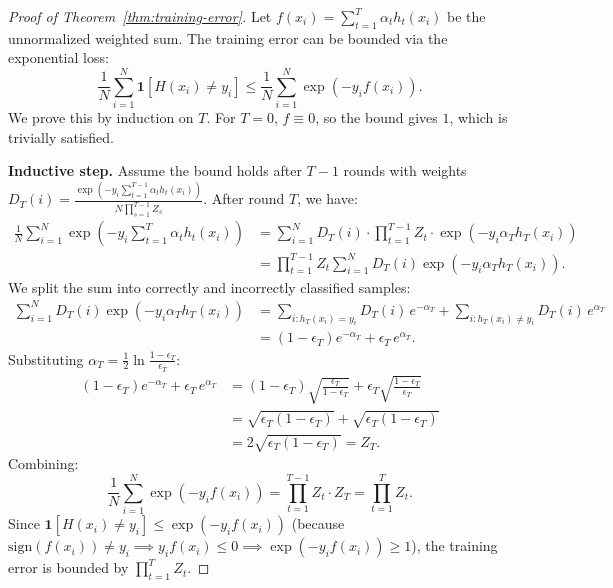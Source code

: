 \begin{proof}[Proof of Theorem~\ref{thm:training-error}]
Let $f(x_i) = \sum_{t=1}^{T} \alpha_t h_t(x_i)$ be the unnormalized weighted sum. The training error can be bounded via the exponential loss:
\[
\frac{1}{N}\sum_{i=1}^N \mathbf{1}[H(x_i) \neq y_i] \leq \frac{1}{N}\sum_{i=1}^N \exp(-y_i f(x_i)).
\]
We prove this by induction on $T$. For $T = 0$, $f \equiv 0$, so the bound gives $1$, which is trivially satisfied.

\textbf{Inductive step.} Assume the bound holds after $T - 1$ rounds with weights $D_T(i) = \frac{\exp(-y_i \sum_{t=1}^{T-1} \alpha_t h_t(x_i))}{N \prod_{s=1}^{T-1} Z_s}$. After round $T$, we have:
\begin{align*}
\frac{1}{N}\sum_{i=1}^N \exp\!\left(-y_i \sum_{t=1}^{T} \alpha_t h_t(x_i)\right)
&= \sum_{i=1}^N D_T(i) \cdot \prod_{t=1}^{T-1} Z_t \cdot \exp(-y_i \alpha_T h_T(x_i)) \\
&= \prod_{t=1}^{T-1} Z_t \sum_{i=1}^N D_T(i) \exp(-y_i \alpha_T h_T(x_i)).
\end{align*}
We split the sum into correctly and incorrectly classified samples:
\begin{align*}
\sum_{i=1}^N D_T(i) \exp(-y_i \alpha_T h_T(x_i))
&= \sum_{i: h_T(x_i) = y_i} D_T(i) \, e^{-\alpha_T} + \sum_{i: h_T(x_i) \neq y_i} D_T(i) \, e^{\alpha_T} \\
&= (1 - \epsilon_T) e^{-\alpha_T} + \epsilon_T \, e^{\alpha_T}.
\end{align*}
Substituting $\alpha_T = \frac{1}{2}\ln\frac{1-\epsilon_T}{\epsilon_T}$:
\begin{align*}
(1 - \epsilon_T) e^{-\alpha_T} + \epsilon_T \, e^{\alpha_T}
&= (1 - \epsilon_T) \sqrt{\frac{\epsilon_T}{1 - \epsilon_T}} + \epsilon_T \sqrt{\frac{1 - \epsilon_T}{\epsilon_T}} \\
&= \sqrt{\epsilon_T(1-\epsilon_T)} + \sqrt{\epsilon_T(1-\epsilon_T)} \\
&= 2\sqrt{\epsilon_T(1 - \epsilon_T)} = Z_T.
\end{align*}
Combining:
\[
\frac{1}{N}\sum_{i=1}^N \exp(-y_i f(x_i)) = \prod_{t=1}^{T-1} Z_t \cdot Z_T = \prod_{t=1}^T Z_t.
\]
Since $\mathbf{1}[H(x_i) \neq y_i] \leq \exp(-y_i f(x_i))$ (because $\mathrm{sign}(f(x_i)) \neq y_i \implies y_i f(x_i) \leq 0 \implies \exp(-y_i f(x_i)) \geq 1$), the training error is bounded by $\prod_{t=1}^T Z_t$.
\end{proof}

